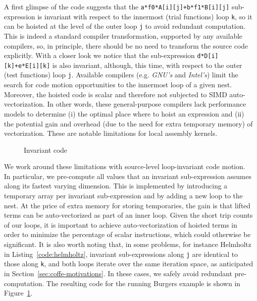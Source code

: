 A first glimpse of the code suggests that the \texttt{a*f0*A[i][j]+b*f1*B[i][j]} sub-expression is invariant with respect to the innermost (trial functions) loop \texttt{k}, so it can be hoisted at the level of the outer loop \texttt{j} to avoid redundant computation. This is indeed a standard compiler transformation, supported by any available compilers, so, in principle, there should be no need to transform the source code explicitly. With a closer look we notice that the sub-expression \texttt{d*D[i][k]+e*E[i][k]} is also invariant, although, this time, with respect to the outer (test functions) loop \texttt{j}. Available compilers (e.g. \emph{GNU's} and \emph{Intel's}) limit the search for code motion opportunities to the innermost loop of a given nest. Moreover, the hoisted code is scalar and therefore not subjected to SIMD auto-vectorization. In other words, these general-purpose compilers lack performance models to determine (i) the optimal place where to hoist an expression and (ii) the potential gain and overhead (due to the need for extra temporary memory) of vectorization. These are notable limitations for local assembly kernels. 

\begin{figure}
\centering
\label{code:invariant-code}
\footnotesize

\caption{Invariant code}
\end{figure}

We work around these limitations with source-level loop-invariant code motion. In particular, we pre-compute all values that an invariant sub-expression assumes along its fastest varying dimension. This is implemented by introducing a temporary array per invariant sub-expression and by adding a new loop to the nest. At the price of extra memory for storing temporaries, the gain is that lifted terms can be auto-vectorized as part of an inner loop. Given the short trip counts of our loops, it is important to achieve auto-vectorization of hoisted terms in order to minimize the percentage of scalar instructions, which could otherwise be significant. It is also worth noting that, in some problems, for instance Helmholtz in Listing~\ref{code:helmholtz}, invariant sub-expressions along \texttt{j} are identical to those along \texttt{k}, and both loops iterate over the same iteration space, as anticipated in Section~\ref{sec:coffe-motivations}. In these cases, we safely avoid redundant pre-computation. The resulting code for the running Burgers example is shown in Figure~\ref{code:invariant-code}.

